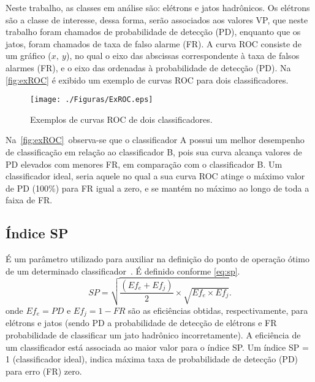 Neste trabalho, as classes em análise são: elétrons e jatos hadrônicos. Os elétrons são a classe de interesse, dessa forma, serão associados aos valores VP, que neste trabalho foram chamados de probabilidade de detecção (PD), enquanto que os jatos, foram chamados de taxa de falso alarme (FR). A curva ROC consiste de um gráfico ($x,\ y$), no qual o eixo das abscissas correspondente à taxa de falsos alarmes (FR), e o eixo das ordenadas à probabilidade de detecção (PD). Na \autoref{fig:exROC} é exibido um exemplo de curvas ROC para dois classificadores.

\begin{figure}[H]
	\centering  
	\caption{Exemplos de curvas ROC de dois classificadores.}
	\texttt{[image: ./Figuras/ExROC.eps]}
	\label{fig:exROC}
\end{figure}

Na~\autoref{fig:exROC}~observa-se que o classificador A possui um melhor desempenho de classificação em relação ao classificador B, pois sua curva alcança valores de PD elevados com menores FR, em comparação com o classificador B. Um classificador ideal, seria aquele no qual a sua curva ROC atinge o máximo valor de PD (100\%) para FR igual a zero, e se mantém no máximo ao longo de toda a faixa de FR.


\subsection{Índice SP}

É um parâmetro utilizado para auxiliar na definição do ponto de operação ótimo de um determinado classificador~\cite{torres2009}. É definido conforme \autoref{eq:sp}.
\begin{equation}
   SP = \sqrt{\frac{(Ef_e + Ef_j)}{2} \times \sqrt{Ef_e \times Ef_j}}. \label{eq:sp}
\end{equation}
onde $Ef_e = PD$ e $Ef_j = 1 - FR$ são as eficiências obtidas, respectivamente, para elétrons e jatos (sendo PD a probabilidade de detecção de elétrons e FR probabilidade de classificar um jato hadrônico incorretamente). A eficiência de um classificador está associada ao maior valor para o índice SP. Um índice SP = 1 (classificador ideal), indica máxima taxa de probabilidade de detecção (PD) para erro (FR) zero.


